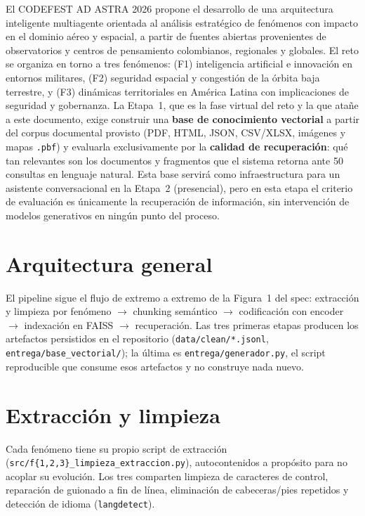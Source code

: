 \documentclass[11pt]{article}
\newcommand{\codigo}[1]{\texttt{\small #1}}
\begin{document}
El CODEFEST AD ASTRA 2026 propone el desarrollo de una arquitectura
inteligente multiagente orientada al análisis estratégico de fenómenos con
impacto en el dominio aéreo y espacial, a partir de fuentes abiertas
provenientes de observatorios y centros de pensamiento colombianos,
regionales y globales. El reto se organiza en torno a tres fenómenos: (F1)
inteligencia artificial e innovación en entornos militares, (F2) seguridad
espacial y congestión de la órbita baja terrestre, y (F3) dinámicas
territoriales en América Latina con implicaciones de seguridad y
gobernanza. La Etapa~1, que es la fase virtual del reto y la que atañe a
este documento, exige construir una \textbf{base de conocimiento vectorial}
a partir del corpus documental provisto (PDF, HTML, JSON, CSV/XLSX,
imágenes y mapas \codigo{.pbf}) y evaluarla exclusivamente por la
\textbf{calidad de recuperación}: qué tan relevantes son los documentos y
fragmentos que el sistema retorna ante 50 consultas en lenguaje natural.
Esta base servirá como infraestructura para un asistente conversacional
en la Etapa~2 (presencial), pero en esta etapa el criterio de evaluación
es únicamente la recuperación de información, sin intervención de modelos
generativos en ningún punto del proceso.

\section{Arquitectura general}

El pipeline sigue el flujo de extremo a extremo de la Figura~1 del spec:
extracción y limpieza por fenómeno $\rightarrow$ chunking semántico
$\rightarrow$ codificación con encoder $\rightarrow$ indexación en FAISS
$\rightarrow$ recuperación. Las tres primeras etapas producen los artefactos
persistidos en el repositorio (\codigo{data/clean/*.jsonl},
\codigo{entrega/base\_vectorial/}); la última es \codigo{entrega/generador.py},
el script reproducible que consume esos artefactos y no construye nada nuevo.

\section{Extracción y limpieza}

Cada fenómeno tiene su propio script de extracción
(\codigo{src/f\{1,2,3\}\_limpieza\_extraccion.py}), autocontenidos a propósito
para no acoplar su evolución. Los tres comparten limpieza de caracteres de
control, reparación de guionado a fin de línea, eliminación de cabeceras/pies
repetidos y detección de idioma (\codigo{langdetect}).
\end{document}
